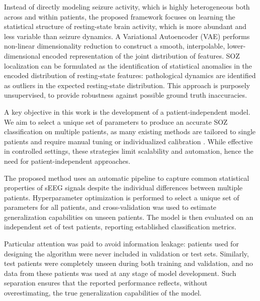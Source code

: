 Instead of directly modeling seizure activity, which is highly heterogeneous
both across and within patients, the proposed framework focuses on learning
the statistical structure of resting-state brain activity, which is more
abundant and less variable than seizure dynamics.
A Variational Autoencoder (VAE) performs non-linear dimensionality reduction
to construct a smooth, interpolable, lower-dimensional encoded representation
of the joint distribution of features.
SOZ localization can be formulated as the identification of statistical
anomalies in the encoded distribution of resting-state features: pathological
dynamics are identified as outliers in the expected resting-state distribution.
This approach is purposely unsupervised, to provide robustness against possible
ground truth inaccuracies.

A key objective in this work is the development of a patient-independent model.
We aim to select a unique set of parameters to produce an accurate SOZ
classification on multiple patients, as many existing methods are tailored to
single patients and require manual tuning or individualized calibration
\cite{ep-rev2}.
While effective in controlled settings, these strategies limit scalability and
automation, hence the need for patient-independent approaches.

The proposed method uses an automatic pipeline to capture common 
statistical properties of sEEG signals despite the individual differences
between multiple patients.
Hyperparameter optimization is performed to select a unique set of parameters
for all patients, and cross-validation was used to estimate generalization
capabilities on unseen patients.
The model is then evaluated on an independent set of test patients, reporting
established classification metrics.

Particular attention was paid to avoid information leakage: patients used for 
designing the algorithm were never included in validation or test sets.
Similarly, test patients were completely unseen during both training and
validation, and no data from these patients was used at any stage of model
development.
Such separation ensures that the reported performance reflects, without
overestimating, the true generalization capabilities of the model.